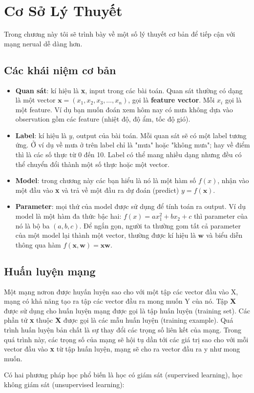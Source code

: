 
\everymath{\displaystyle}  

\chapter{Cơ Sở Lý Thuyết}
\label{chap:chap3}

\noindent Trong chương này tôi sẽ trình bày về một số lý thuyết cơ bản để tiếp cận với mạng nerual dễ dàng hơn. 

\section{Các khái niệm cơ bản}
\begin{itemize}
	\item \textbf{Quan sát}: kí hiệu là \textbf{x}, input trong các bài toán. Quan sát thường có dạng là một vector $\textbf{x}=(x_1,x_2,x_3,\ldots, x_n)$, gọi là \textbf{feature vector}. Mỗi $x_i$ gọi là một feature. Ví dụ bạn muốn đoán xem hôm nay có mưa không dựa vào observation gồm các feature (nhiệt độ, độ ẩm, tốc độ gió).	
\item \textbf{Label}: kí hiệu là $y$, output của bài toán. Mỗi quan sát sẽ có một label tương ứng. Ở ví dụ về mưa ở trên label chỉ là "mưa" hoặc "không mưa"; hay về điểm thì là các số thực từ 0 đến 10. Label có thể mang nhiều dạng nhưng đều có thể chuyển đổi thành một số thực hoặc một vector. 
\item \textbf{Model}: trong chương này các bạn hiểu là nó là một hàm số $f(x)$, nhận vào một đầu vào \textbf{x} và trả về một đầu ra dự đoán (predict) $y=f(\textbf{x})$.
\item \textbf{Parameter}: mọi thứ của model được sử dụng để tính toán ra output. Ví dụ model là một hàm đa thức bậc hai: $f(x) = ax_1^2 + bx_2 + c$ thì parameter của nó là bộ ba $(a,b,c)$. Để ngắn gọn, người ta thường gom tất cả parameter của một model lại thành một vector, thường được kí hiệu là $\textbf{w}$ và biểu diễn thông qua hàm $f(\textbf{x},\textbf{w}) = \textbf{x}\textbf{w}$.

\end{itemize}
\section{Huấn luyện mạng}
Một mạng nơron được huyấn luyện sao cho với một tập các vector đầu vào
X, mạng có khả năng tạo ra tập các vector đầu ra mong muốn Y của nó. Tập \textbf{X} được sử dụng cho huấn luyện mạng được gọi là tập huấn luyện (training set). Các phần tử \textbf{x} thuộc \textbf{X} được gọi là các mẫu huấn luyện (training example). Quá trình huấn luyện bản chất là sự thay đổi các trọng số liên kết của mạng. Trong quá trình này, các trọng số của mạng sẽ hội tụ dần tới các giá trị sao cho với mỗi vector đầu vào \textbf{x} từ tập huấn luyện, mạng sẽ cho ra vector đầu ra y như mong muốn.\par
Có hai phương pháp học phổ biến là học có giám sát (supervised learning), học không giám sát (unsupervised learning):

